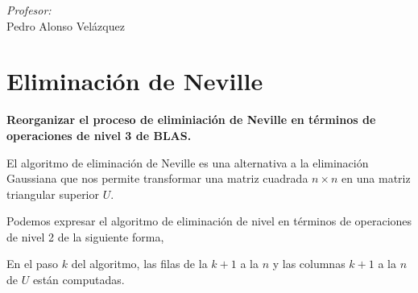 \documentclass[a4paper,12pt]{article}
\begin{document}
\begin{titlepage}
\begin{center}
\begin{minipage}{0.4\textwidth}
\begin{flushright}
\emph{Profesor:} \\
Pedro Alonso Vel\'azquez\\
\end{flushright}
\end{minipage}

\end{center}


\end{titlepage}

\pagebreak
\tableofcontents
\pagebreak

\section{Eliminaci\'on de Neville}


\textbf{Reorganizar el proceso de eliminiaci\'on de Neville en t\'erminos de operaciones de nivel 3 de BLAS.}\\

\smallskip

El algoritmo de eliminaci\'on de Neville es una alternativa a la eliminaci\'on Gaussiana que nos permite transformar una matriz cuadrada $n\times n$  en una matriz triangular superior $U$.

Podemos expresar el algoritmo de eliminación de nivel en t\'erminos de operaciones de nivel 2 de la siguiente forma,\\


\begin{algorithmic}[1]\label{neville2}
                   \ENDFOR
                \ENDFOR
        \ENDFOR
\end{algorithmic}



\bigskip

En el paso $k$ del algoritmo, las filas de la $k+1$ a la $n$ y las columnas $k+1$ a la $n$ de $U$ están computadas. 
\end{document}

